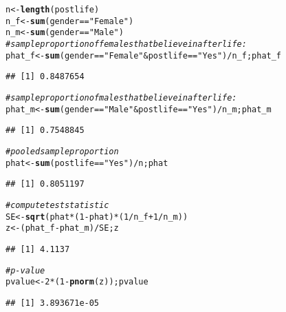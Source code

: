 \documentclass[11pt]{article}\usepackage[]{graphicx}\usepackage[]{color}
\makeatletter
\newcommand{\hlnum}[1]{\textcolor[rgb]{0.686,0.059,0.569}{#1}}%
\newcommand{\hlstr}[1]{\textcolor[rgb]{0.192,0.494,0.8}{#1}}%
\newcommand{\hlcom}[1]{\textcolor[rgb]{0.678,0.584,0.686}{\textit{#1}}}%
\newcommand{\hlopt}[1]{\textcolor[rgb]{0,0,0}{#1}}%
\newcommand{\hlstd}[1]{\textcolor[rgb]{0.345,0.345,0.345}{#1}}%
\newcommand{\hlkwb}[1]{\textcolor[rgb]{0.69,0.353,0.396}{#1}}%
\newcommand{\hlkwd}[1]{\textcolor[rgb]{0.737,0.353,0.396}{\textbf{#1}}}%
\newenvironment{kframe}{%
 \def\at@end@of@kframe{}%
 \ifinner\ifhmode%
  \def\at@end@of@kframe{\end{minipage}}%
  \begin{minipage}{\columnwidth}%
 \fi\fi%
 \def\FrameCommand##1{\hskip\@totalleftmargin \hskip-\fboxsep
 \colorbox{shadecolor}{##1}\hskip-\fboxsep
     \hskip-\linewidth \hskip-\@totalleftmargin \hskip\columnwidth}%
 \MakeFramed {\advance\hsize-\width
   \@totalleftmargin\z@ \linewidth\hsize
   \@setminipage}}%
 {\par\unskip\endMakeFramed%
 \at@end@of@kframe}
\newenvironment{knitrout}{}{} %
\makeatother
\begin{document}
\begin{knitrout}
\color{fgcolor}\begin{kframe}
\begin{alltt}
\hlstd{n} \hlkwb{<-} \hlkwd{length}\hlstd{(postlife)}
\hlstd{n_f} \hlkwb{<-} \hlkwd{sum}\hlstd{(gender} \hlopt{==} \hlstr{"Female"}\hlstd{)}
\hlstd{n_m} \hlkwb{<-}  \hlkwd{sum}\hlstd{(gender} \hlopt{==} \hlstr{"Male"}\hlstd{)}
\hlcom{# sample proportion of females that believe in afterlife:}
\hlstd{phat_f} \hlkwb{<-} \hlkwd{sum}\hlstd{(gender} \hlopt{==} \hlstr{"Female"} \hlopt{&} \hlstd{postlife} \hlopt{==} \hlstr{"Yes"}\hlstd{)} \hlopt{/} \hlstd{n_f; phat_f}
\end{alltt}
\begin{verbatim}
## [1] 0.8487654
\end{verbatim}
\begin{alltt}
\hlcom{# sample proportion of males that believe in afterlife:}
\hlstd{phat_m} \hlkwb{<-} \hlkwd{sum}\hlstd{(gender} \hlopt{==} \hlstr{"Male"} \hlopt{&} \hlstd{postlife} \hlopt{==} \hlstr{"Yes"}\hlstd{)} \hlopt{/} \hlstd{n_m; phat_m}
\end{alltt}
\begin{verbatim}
## [1] 0.7548845
\end{verbatim}
\begin{alltt}
\hlcom{# pooled sample proportion}
\hlstd{phat} \hlkwb{<-} \hlkwd{sum}\hlstd{(postlife} \hlopt{==} \hlstr{"Yes"}\hlstd{)} \hlopt{/} \hlstd{n; phat}
\end{alltt}
\begin{verbatim}
## [1] 0.8051197
\end{verbatim}
\end{kframe}
\end{knitrout}
\clearpage

\begin{knitrout}
\color{fgcolor}\begin{kframe}
\begin{alltt}
\hlcom{# compute test statistic}
\hlstd{SE} \hlkwb{<-} \hlkwd{sqrt}\hlstd{(phat}\hlopt{*}\hlstd{(}\hlnum{1}\hlopt{-}\hlstd{phat)}\hlopt{*}\hlstd{(}\hlnum{1}\hlopt{/}\hlstd{n_f} \hlopt{+} \hlnum{1}\hlopt{/}\hlstd{n_m))}
\hlstd{z} \hlkwb{<-} \hlstd{(phat_f} \hlopt{-} \hlstd{phat_m)} \hlopt{/} \hlstd{SE; z}
\end{alltt}
\begin{verbatim}
## [1] 4.1137
\end{verbatim}
\begin{alltt}
\hlcom{# p-value}
\hlstd{pvalue} \hlkwb{<-}  \hlnum{2} \hlopt{*} \hlstd{(}\hlnum{1} \hlopt{-} \hlkwd{pnorm}\hlstd{(z)); pvalue}
\end{alltt}
\begin{verbatim}
## [1] 3.893671e-05
\end{verbatim}
\end{kframe}
\end{knitrout}
\end{document}
